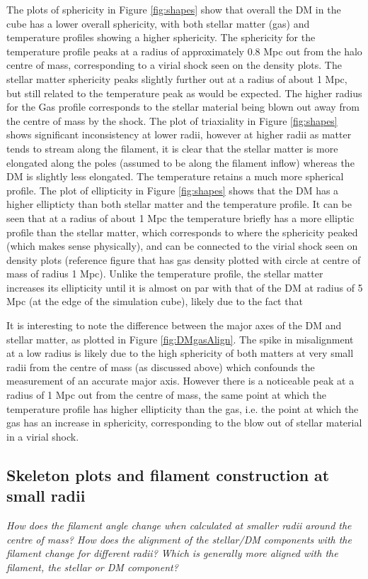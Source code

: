\documentclass[journal]{IEEEtran}
\begin{document}
The plots of sphericity in Figure \ref{fig:shapes} show that overall the DM in the cube has a lower overall sphericity, with both stellar matter (gas) and temperature profiles showing a higher sphericity. The sphericity for the temperature profile peaks at a radius of approximately 0.8 Mpc out from the halo centre of mass, corresponding to a virial shock seen on the density plots. The stellar matter sphericity peaks slightly further out at a radius of about 1 Mpc, but still related to the temperature peak as would be expected. The higher radius for the Gas profile corresponds to the stellar material being blown out away from the centre of mass by the shock. 
The plot of triaxiality in Figure \ref{fig:shapes} shows significant inconsistency at lower radii, however at higher radii as matter tends to stream along the filament, it is clear that the stellar matter is more elongated along the poles (assumed to be along the filament inflow) whereas the DM is slightly less elongated. The temperature retains a much more spherical profile.
The plot of ellipticity in Figure \ref{fig:shapes} shows that the DM has a higher ellipticty than both stellar matter and the temperature profile. It can be seen that at a radius of about 1 Mpc the temperature briefly has a more elliptic profile than the stellar matter, which corresponds to where the sphericity peaked (which makes sense physically), and can be connected to the virial shock seen on density plots (reference figure that has gas density plotted with circle at centre of mass of radius 1 Mpc). Unlike the temperature profile, the stellar matter increases its ellipticity until it is almost on par with that of the DM at radius of 5 Mpc (at the edge of the simulation cube), likely due to the fact that 

It is interesting to note the difference between the major axes of the DM and stellar matter, as plotted in Figure \ref{fig:DMgasAlign}. The spike in misalignment at a low radius is likely due to the high sphericity of both matters at very small radii from the centre of mass (as discussed above) which confounds the measurement of an accurate major axis. However there is a noticeable peak at a radius of 1 Mpc out from the centre of mass, the same point at which the temperature profile has higher ellipticity than the gas, i.e. the point at which the gas has an increase in sphericity, corresponding to the blow out of stellar material in a virial shock.

\subsection{Skeleton plots and filament construction at small radii}
\textit{How does the filament angle change when calculated at smaller radii around the centre of mass?
How does the alignment of the stellar/DM components with the filament change for different radii?
Which is generally more aligned with the filament, the stellar or DM component?}
\end{document}
